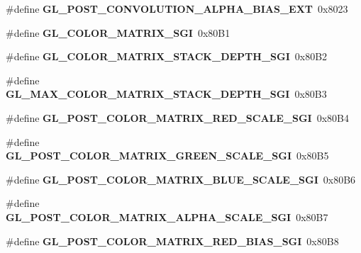 \begin{DoxyCompactItemize}
\item 
\#define {\bfseries G\+L\+\_\+\+P\+O\+S\+T\+\_\+\+C\+O\+N\+V\+O\+L\+U\+T\+I\+O\+N\+\_\+\+A\+L\+P\+H\+A\+\_\+\+B\+I\+A\+S\+\_\+\+E\+X\+T}~0x8023\label{_s_d_l__opengl_8h_a9ee5b7a0ca198787ce18493eec857ad7}

\item 
\#define {\bfseries G\+L\+\_\+\+C\+O\+L\+O\+R\+\_\+\+M\+A\+T\+R\+I\+X\+\_\+\+S\+G\+I}~0x80\+B1\label{_s_d_l__opengl_8h_a1e5816df1feffec4ce29837ecd142537}

\item 
\#define {\bfseries G\+L\+\_\+\+C\+O\+L\+O\+R\+\_\+\+M\+A\+T\+R\+I\+X\+\_\+\+S\+T\+A\+C\+K\+\_\+\+D\+E\+P\+T\+H\+\_\+\+S\+G\+I}~0x80\+B2\label{_s_d_l__opengl_8h_a9b94dba68e49844834420611b5f7117b}

\item 
\#define {\bfseries G\+L\+\_\+\+M\+A\+X\+\_\+\+C\+O\+L\+O\+R\+\_\+\+M\+A\+T\+R\+I\+X\+\_\+\+S\+T\+A\+C\+K\+\_\+\+D\+E\+P\+T\+H\+\_\+\+S\+G\+I}~0x80\+B3\label{_s_d_l__opengl_8h_ac2c9e03e7e211acbbea8ad938a15d866}

\item 
\#define {\bfseries G\+L\+\_\+\+P\+O\+S\+T\+\_\+\+C\+O\+L\+O\+R\+\_\+\+M\+A\+T\+R\+I\+X\+\_\+\+R\+E\+D\+\_\+\+S\+C\+A\+L\+E\+\_\+\+S\+G\+I}~0x80\+B4\label{_s_d_l__opengl_8h_a0f4c05beb3c5118279f68cc591d3df06}

\item 
\#define {\bfseries G\+L\+\_\+\+P\+O\+S\+T\+\_\+\+C\+O\+L\+O\+R\+\_\+\+M\+A\+T\+R\+I\+X\+\_\+\+G\+R\+E\+E\+N\+\_\+\+S\+C\+A\+L\+E\+\_\+\+S\+G\+I}~0x80\+B5\label{_s_d_l__opengl_8h_a77cfb9ce05b58d460ec1d394159ab2a1}

\item 
\#define {\bfseries G\+L\+\_\+\+P\+O\+S\+T\+\_\+\+C\+O\+L\+O\+R\+\_\+\+M\+A\+T\+R\+I\+X\+\_\+\+B\+L\+U\+E\+\_\+\+S\+C\+A\+L\+E\+\_\+\+S\+G\+I}~0x80\+B6\label{_s_d_l__opengl_8h_a93e0887d1967652796855a970cf2c39a}

\item 
\#define {\bfseries G\+L\+\_\+\+P\+O\+S\+T\+\_\+\+C\+O\+L\+O\+R\+\_\+\+M\+A\+T\+R\+I\+X\+\_\+\+A\+L\+P\+H\+A\+\_\+\+S\+C\+A\+L\+E\+\_\+\+S\+G\+I}~0x80\+B7\label{_s_d_l__opengl_8h_ad4ea1f440645882397344bd53847b067}

\item 
\#define {\bfseries G\+L\+\_\+\+P\+O\+S\+T\+\_\+\+C\+O\+L\+O\+R\+\_\+\+M\+A\+T\+R\+I\+X\+\_\+\+R\+E\+D\+\_\+\+B\+I\+A\+S\+\_\+\+S\+G\+I}~0x80\+B8\label{_s_d_l__opengl_8h_a4bb4f4cd3672735d79e38d3390bbe02e}


\end{DoxyCompactItemize}
